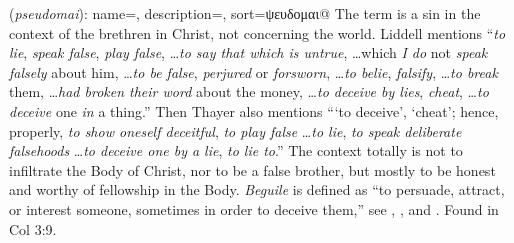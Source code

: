 \item[Beguile,]

(\textit{pseudomai}):
{
    name=,
    description={},
    sort=ψευδομαι@
}
The term is a sin in the context of the brethren in Christ, not concerning the world. Liddell mentions ``\emph{to lie}, \emph{speak false}, \emph{play false}, \ldots \emph{to say that which is untrue}, \ldots which \emph{I do} not \emph{speak falsely} about him, \ldots \emph{to be false}, \emph{perjured} or \emph{forsworn}, \ldots \emph{to belie}, \emph{falsify}, \ldots \emph{to break} them, \ldots \emph{had broken their word} about the money, \ldots \emph{to deceive by lies}, \emph{cheat}, \ldots \emph{to deceive} one \emph{in} a thing.'' Then Thayer also mentions ```to deceive', `cheat'; hence, properly, \emph{to show oneself deceitful}, \emph{to play false} \ldots \emph{to lie}, \emph{to speak deliberate falsehoods} \ldots \emph{to deceive one by a lie}, \emph{to lie to}.'' The context totally is not to infiltrate the Body of Christ, nor to be a false brother, but mostly to be honest and worthy of fellowship in the Body. \emph{Beguile} is defined as ``to persuade, attract, or interest someone, sometimes in order to deceive them,'' see , , and .
Found in Col 3:9.
